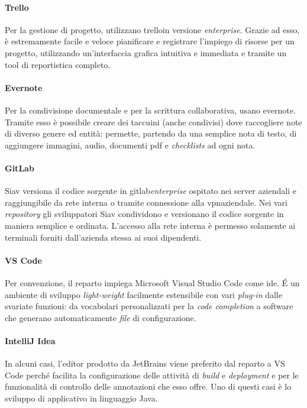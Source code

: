 \paragraph{Trello}
Per la gestione di progetto, utilizzano \gls{trello}\glsfirstoccur in versione \textit{enterprise}. Grazie ad esso, è estremamente facile e veloce pianificare e registrare l'impiego di risorse per un progetto, utilizzando un'interfaccia grafica intuitiva e immediata e tramite un tool di reportistica completo.

\paragraph{Evernote}Per la condivisione documentale e per la scrittura collaborativa, usano \gls{evernote}\glsfirstoccur. Tramite esso è possibile creare dei taccuini (anche condivisi) dove raccogliere note di diverso genere ed entità: permette, partendo da una semplice nota di testo, di aggiungere immagini, audio, documenti pdf e \textit{checklists} ad ogni nota.


\paragraph{GitLab}Siav versiona il codice sorgente in \gls{gitlab}\glsfirstoccur \textit{enterprise} ospitato nei server aziendali e raggiungibile da rete interna o tramite connessione alla \acrshort{vpn}\glsfirstoccur aziendale. Nei vari \textit{repository} gli sviluppatori Siav condividono e versionano il codice sorgente in maniera semplice e ordinata.
L'accesso alla rete interna è permesso solamente ai terminali forniti dall'azienda stessa ai suoi dipendenti.

\paragraph{VS Code} Per convenzione, il reparto impiega Microsoft Visual Studio Code come \acrshort{ide}. \'E un ambiente di sviluppo \textit{light-weight} facilmente estensibile con vari \textit{plug-in} dalle svariate funzioni: da vocabolari personalizzati per la \textit{code completion} a software che generano automaticamente \textit{file} di configurazione.

\paragraph{IntelliJ Idea} In alcuni casi, l'editor prodotto da JetBrains viene preferito dal reparto a VS Code perché facilita la configurazione delle attività di \textit{build} e \textit{deployment} e per le funzionalità di controllo delle annotazioni che esso offre. Uno di questi casi è lo sviluppo di applicativo in linguaggio Java.


